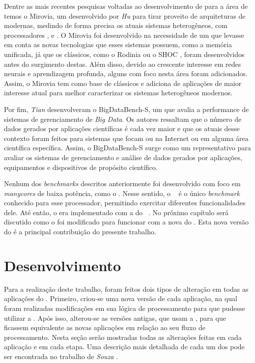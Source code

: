 Dentre as mais recentes pesquisas voltadas ao desenvolvimento de \benchs para a área de \HPC temos o Mirovia, um \bench desenvolvido por \textit{Hu} \etal \cite{miroviabenchmark} para tirar proveito de arquiteturas de \GPUs modernas, medindo de forma precisa os atuais sistemas heterogêneos, com processadores \multicore, \manycore e \GPUs. O Mirovia foi desenvolvido na necessidade de um \bench que levasse em conta as novas tecnologias que esses sistemas possuem, como a memória unificada, já que os \benchs clássicos, como o Rodinia \cite{rodiniabench} ou o SHOC \cite{shocbench}, foram desenvolvidos antes do surgimento destas. Além disso, devido ao crescente interesse em redes neurais e aprendizagem profunda, alguns  com foco nesta área foram adicionados. Assim, o Mirovia tem como base  de \benchs clássicos e adiciona  de aplicações de maior interesse atual para melhor caracterizar os sistemas heterogêneos modernos.

Por fim, \textit{Tian} \etal \cite{tianbench} desenvolveram o BigDataBench-S, um \bench que avalia a performance de sistemas de gerenciamento de \textit{Big Data}. Os autores ressaltam que o número de dados gerados por aplicações científicas é cada vez maior e que os atuais \benchs desse contexto foram feitos para sistemas que focam ou na Internet ou em alguma área científica específica. Assim, o BigDataBench-S surge como um \bench representativo para avaliar os sistemas de gerenciamento e análise de dados gerados por aplicações, equipamentos e dispositivos de propósito científico.

Nenhum dos \textit{benchmarks} descritos anteriormente foi desenvolvido com foco em \textit{manycores} de baixa potência, como o \mppa. Nesse sentido, o \capb~\cite{Castro-Souza-CCPE:2016} é o único \textit{benchmark} conhecido para esse processador, permitindo exercitar diferentes funcionalidades dele. Até então, o \capb era implementado com a \API \IPC do \mppa~\cite{mppa2562013}. No próximo capítulo será discutido como o \capb foi modificado para funcionar com a nova \API \ASYNC do \mppa. Esta nova versão do \capb é a principal contribuição do presente trabalho.

\chapter{Desenvolvimento}
\label{ch:desenvolvimento}

Para a realização deste trabalho, foram feitos dois tipos de alteração em todas as aplicações do \capb. Primeiro, criou-se uma nova versão de cada aplicação, na qual foram realizadas modificações em sua lógica de processamento para que pudesse utilizar a \API \ASYNC. Após isso, alterou-se as versões antigas, que usam a \API \IPC, para que ficassem equivalente as novas aplicações em relação ao seu fluxo de processamento. Nesta seção serão mostradas todas as alterações feitas em cada aplicação e em cada etapa. Uma descrição mais detalhada de cada um dos  pode ser encontrada no trabalho de \textit{Souza} \etal \cite{Castro-Souza-CCPE:2016}.

